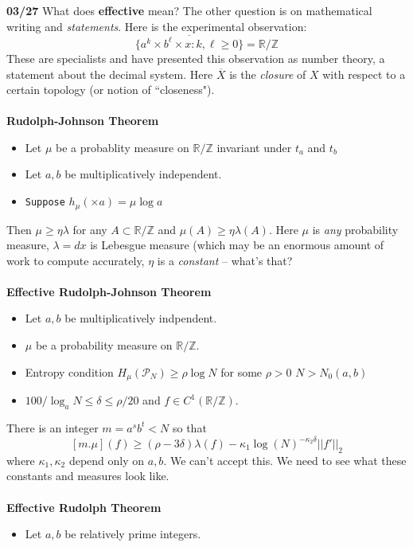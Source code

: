 \documentclass[12pt]{article}
\begin{document}
{\noindent \textbf{03/27} What does {\color{blue} \textbf{effective}} mean? The other question is on mathematical writing and \textit{statements}.  Here is the experimental observation:
$$ \overline{\{ a^k \times b^\ell \times x : k, \ell \geq 0 \}} = \mathbb{R}/\mathbb{Z} $$ 
These are specialists and have presented this observation as number theory, a statement about the decimal system.  Here $\overline{X}$ is the \textit{closure} of $X$ with respect to a certain topology (or notion of ``closeness").\\ \\
\textbf{Rudolph-Johnson Theorem} 
\begin{itemize}
\item Let $\mu$ be a probablity measure on $\mathbb{R}/\mathbb{Z}$ invariant under $t_a$ and $t_b$
\item Let $a,b$ be multiplicatively independent.
\item \texttt{Suppose} $h_\mu( \times a) = \mu \log a $
\end{itemize}
Then $\mu \geq \eta \lambda$ for any $A \subset \mathbb{R}/\mathbb{Z}$ and $\mu(A) \geq \eta \lambda(A)$.  Here $\mu$ is \textit{any} probability measure, $\lambda = dx$ is Lebesgue measure (which may be an enormous amount of work to compute accurately, $\eta$ is a \textit{constant} -- what's that? \\ \\
\textbf{Effective Rudolph-Johnson Theorem}
\begin{itemize}
\item Let $a,b$ be multiplicatively indpendent.
\item $\mu$ be a probability measure on $\mathbb{R}/\mathbb{Z}$.  
\item Entropy condition $H_\mu(\mathcal{P}_N) \geq \rho \log N $ for some $\rho > 0 $ $N > N_0(a,b)$
\item $ 100/\log_a N \leq \delta \leq \rho/20 $ and $f \in C^1(\mathbb{R}/\mathbb{Z})$. 
\end{itemize}
There is an integer $m = a^sb^t < N$ so that
$$ [m.\mu](f) \geq (\rho - 3\delta) \lambda(f) - \kappa_1 \log (N)^{-\kappa_2 \delta} ||f'||_2 $$
where $\kappa_1, \kappa_2$ depend only on $a,b$.  We can't accept this.  We need to see what these constants and measures look like.  \\ \\
\textbf{Effective Rudolph Theorem}
\begin{itemize}
\item Let $a,b$ be relatively prime integers.

\end{itemize}}
\end{document}
